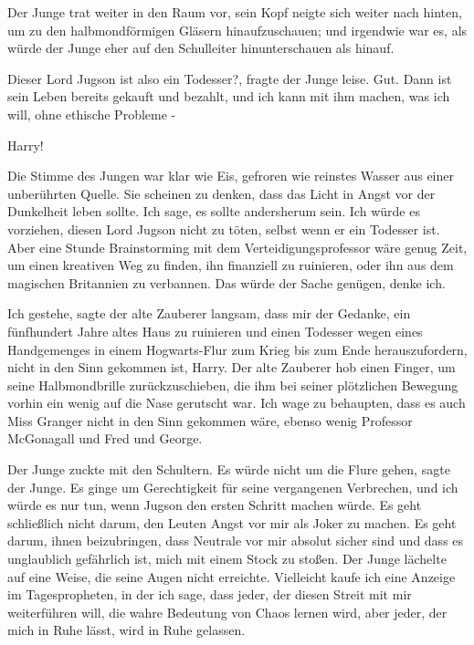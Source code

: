Der Junge trat weiter in den Raum vor, sein Kopf neigte sich weiter nach hinten,
um zu den halbmondförmigen Gläsern hinaufzuschauen; und irgendwie war es, als
würde der Junge eher auf den Schulleiter hinunterschauen als hinauf.

\glqq Dieser Lord Jugson ist also ein Todesser?\grqq{}, fragte der Junge leise.
\glqq Gut. Dann ist sein Leben bereits gekauft und bezahlt, und ich kann mit ihm
machen, was ich will, ohne ethische Probleme -\grqq{}

\glqq Harry!\grqq{}

Die Stimme des Jungen war klar wie Eis, gefroren wie reinstes Wasser aus einer
unberührten Quelle. \glqq Sie scheinen zu denken, dass das Licht in Angst vor
der Dunkelheit leben sollte. Ich sage, es sollte andersherum sein. Ich würde es
vorziehen, diesen Lord Jugson nicht zu töten, selbst wenn er ein Todesser ist.
Aber eine Stunde Brainstorming mit dem Verteidigungsprofessor wäre genug Zeit,
um einen kreativen Weg zu finden, ihn finanziell zu ruinieren, oder ihn aus dem
magischen Britannien zu verbannen. Das würde der Sache genügen, denke
ich.\grqq{}

\glqq Ich gestehe\grqq{}, sagte der alte Zauberer langsam, \glqq dass mir der
Gedanke, ein fünfhundert Jahre altes Haus zu ruinieren und einen Todesser wegen
eines Handgemenges in einem Hogwarts-Flur zum Krieg bis zum Ende
herauszufordern, nicht in den Sinn gekommen ist, Harry.\grqq{} Der alte Zauberer
hob einen Finger, um seine Halbmondbrille zurückzuschieben, die ihm bei seiner
plötzlichen Bewegung vorhin ein wenig auf die Nase gerutscht war. \glqq Ich wage
zu behaupten, dass es auch Miss Granger nicht in den Sinn gekommen wäre, ebenso
wenig Professor McGonagall und Fred und George.\grqq{}

Der Junge zuckte mit den Schultern. \glqq Es würde nicht um die Flure
gehen\grqq{}, sagte der Junge. \glqq Es ginge um Gerechtigkeit für seine
vergangenen Verbrechen, und ich würde es nur tun, wenn Jugson den ersten Schritt
machen würde. Es geht schließlich nicht darum, den Leuten Angst vor mir als
Joker zu machen. Es geht darum, ihnen beizubringen, dass Neutrale vor mir
absolut sicher sind und dass es unglaublich gefährlich ist, mich mit einem Stock
zu stoßen.\grqq{} Der Junge lächelte auf eine Weise, die seine Augen nicht
erreichte. \glqq Vielleicht kaufe ich eine Anzeige im Tagespropheten, in der ich
sage, dass jeder, der diesen Streit mit mir weiterführen will, die wahre
Bedeutung von Chaos lernen wird, aber jeder, der mich in Ruhe lässt, wird in
Ruhe gelassen.\grqq{}

